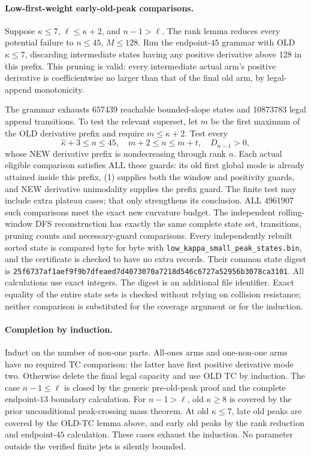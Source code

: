 \paragraph{Low-first-weight early-old-peak comparisons.}
Suppose $\kappa\le7$, $\ell\le\kappa+2$, and $n-1>\ell$.
The rank lemma reduces every potential failure to $n\le45$,
$M\le128$. Run the endpoint-$45$ grammar with OLD $\kappa\le7$,
discarding intermediate states having any positive derivative above
128 in this prefix. This pruning is valid: every intermediate actual
arm's positive derivative is coefficientwise no larger than that of
the final old arm, by legal-append monotonicity.

The grammar exhausts 657439 reachable bounded-slope states and
10873783 legal append transitions. To test the relevant superset,
let $m$ be the first maximum of the OLD derivative prefix and require
$m\le\kappa+2$. Test every
\[
 \widehat\kappa+3\le n\le45,\quad m+2\le n\le m+t,
 \quad D_{n-1}>0,
\]
whose NEW derivative prefix is nondecreasing through rank $n$.
Each actual eligible comparison satisfies ALL these guards: its old
first global mode is already attained inside this prefix, (1) supplies
both the window and positivity guards, and NEW derivative unimodality
supplies the prefix guard. The finite test may include extra plateau
cases; that only strengthens its conclusion.
ALL 4961907 such comparisons meet the exact new curvature budget.
The independent rolling-window DFS reconstruction has exactly the same
complete state set, transitions, pruning counts and necessary-guard
comparisons. Every independently rebuilt sorted state is compared
byte for byte with \texttt{low\_kappa\_small\_peak\_states.bin}, and
the certificate is checked to have no extra records. Their common state digest is
\texttt{25f6737af1aef9f9b7dfeaed7d4073070a7218d546c6727a52956b3078ca3101}.
All calculations use exact integers. The digest is an additional file
identifier. Exact equality of the entire state sets is checked without
relying on collision resistance; neither comparison is substituted for
the coverage argument or for the induction.

\paragraph{Completion by induction.}
Induct on the number of non-one parts. All-ones arms and one-non-one
arms have no required TC comparison: the latter have first positive
derivative mode two. Otherwise delete the final legal capacity and use
OLD TC by induction. The case $n-1\le\ell$ is closed by the generic
pre-old-peak proof and the complete endpoint-$13$ boundary calculation.
For $n-1>\ell$, old $\kappa\ge8$ is covered by the prior unconditional
peak-crossing mass theorem. At old $\kappa\le7$, late old peaks are
covered by the OLD-TC lemma above, and early old peaks by the rank
reduction and endpoint-$45$ calculation. These cases exhaust the
induction. No parameter outside the verified finite jets is silently
bounded.

